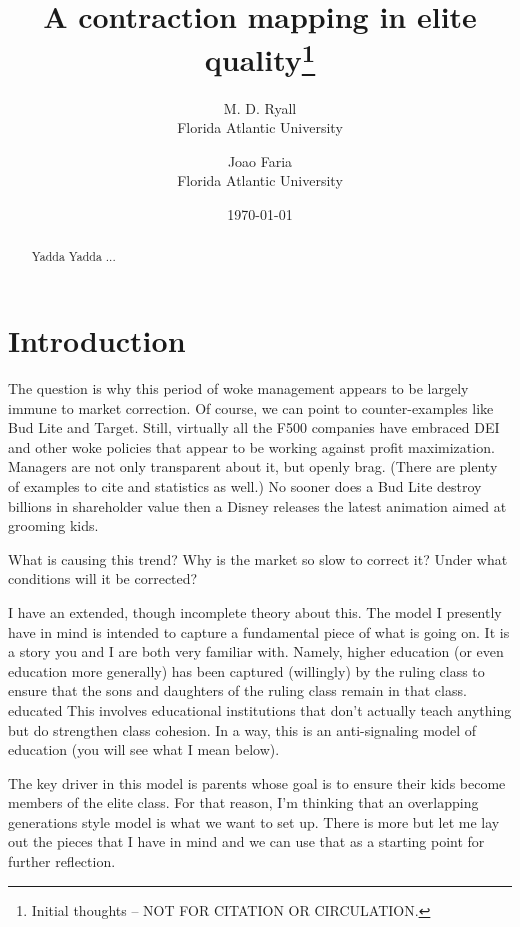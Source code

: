 \documentclass[
12pt,
titlepage,
reqno,
]{article}%
\begin{document}
	
	
	\title{A contraction mapping in elite quality\thanks{Initial thoughts -- NOT FOR CITATION OR CIRCULATION.}}
	\author{
		M. D. Ryall\\ Florida Atlantic University
		\and 
		Joao Faria\\ Florida Atlantic University
	}
	\date{\today}
	\maketitle
	
	\begin{abstract}
		Yadda Yadda ...
	\end{abstract}
	
	\doublespacing
	\def\baselinestretch{1.5}\small\normalsize
	
	
	\section{Introduction}
	The question is why this period of woke management appears to be largely immune to market correction. 
	Of course, we can point to counter-examples like Bud Lite and Target.
	Still, virtually all the F500 companies have embraced DEI and other woke policies that appear to be working against profit maximization.
	Managers are not only transparent about it, but openly brag.
	(There are plenty of examples to cite and statistics as well.)
	No sooner does a Bud Lite destroy billions in shareholder value then a Disney releases the latest animation aimed at grooming kids. 
	
	What is causing this trend?
	Why is the market so slow to correct it? 
	Under what conditions will it be corrected?
	
	I have an extended, though incomplete theory about this. 
	The model I presently have in mind is intended to capture a fundamental piece of what is going on.
	It is a story you and I are both very familiar with.
	Namely, higher education (or even education more generally) has been captured (willingly) by the ruling class to ensure that the sons and daughters of the ruling class remain in that class. educated
	This involves educational institutions that don't actually teach anything but do strengthen class cohesion.
	In a way, this is an anti-signaling model of education (you will see what I mean below).
	
	The key driver in this model is parents whose goal is to ensure their kids become members of the elite class. 
	For that reason, I'm thinking that an overlapping generations style model is what we want to set up.
	There is more but let me lay out the pieces that I have in mind and we can use that as a starting point for further reflection.
	
\end{document}

